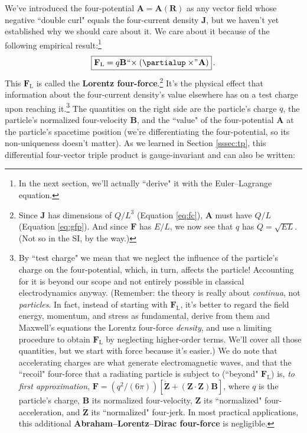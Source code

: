 \documentclass[12pt]{article}
\renewcommand{\vv}[1]{\mathbf{#1}}
\begin{document}
We've introduced the four-potential $\vv A = \vv A (\vv R)$ as any vector field whose negative ``double curl" equals the four-current density $\vv J$, but we haven't yet established why we should care about it. We care about it because of the following empirical result:\footnote{In the next section, we'll actually ``derive" it with the Euler--Lagrange equation.}
\begin{equation}\label{eq:ff}
\boxed{\vv F_{\textrm{L}} = q \vv B \mkern1mu `` \mkern-4mu \times (\partialup \times \mkern-4mu " \mkern1mu \vv A)} \, .
\end{equation}
This $\vv F_{\textrm{L}}$ is called the \textbf{Lorentz four-force}.\footnote{Since $\vv J$ has dimensions of $Q / L^3$ (Equation \ref{eq:fc}), $\vv A$ must have $Q / L$ (Equation \ref{eq:gfp}). And since $\vv F$ has $E / L$, we now see that $q$ has $Q = \sqrt{EL}$. (Not so in the SI, by the way.)} It's the physical effect that information about the four-current density's value elsewhere has on a test charge upon reaching it.\footnote{\label{fn:recoil}By ``test charge" we mean that we neglect the influence of the particle's charge on the four-potential, which, in turn, affects the particle! Accounting for it is beyond our scope and not entirely possible in classical electrodynamics anyway. (Remember: the theory is really about \emph{continua}, not \emph{particles}. In fact, instead of starting with $\vv F_{\textrm{L}}$, it's better to regard the field energy, momentum, and stress as fundamental, derive from them and Maxwell's equations the Lorentz four-force \emph{density}, and use a limiting procedure to obtain $\vv F_{\textrm{L}}$ by neglecting higher-order terms. We'll cover all those quantities, but we start with force because it's easier.) We do note that accelerating charges are what generate electromagnetic waves, and that the ``recoil" four-force that a radiating particle is subject to (``beyond" $\vv F_{\textrm{L}}$) is, \emph{to first approximation}, $\vv F = (q^2 / (6 \pi))[\mathring{\vv Z} + (\vv Z \cdot \vv Z) \vv B]$, where $q$ is the particle's charge, $\vv B$ its normalized four-velocity, $\vv Z$ its ``normalized" four-acceleration, and $\mathring{\vv Z}$ its ``normalized" four-jerk. In most practical applications, this additional \textbf{Abraham--Lorentz--Dirac four-force} is negligible.} The quantities on the right side are the particle's charge $q$, the particle's normalized four-velocity $\vv B$, and the ``value" of the four-potential $\vv A$ at the particle's spacetime position (we're differentiating the four-potential, so its non-uniqueness doesn't matter). As we learned in Section \ref{sssec:tp}, this differential four-vector triple product is gauge-invariant and can also be written:
\end{document}

